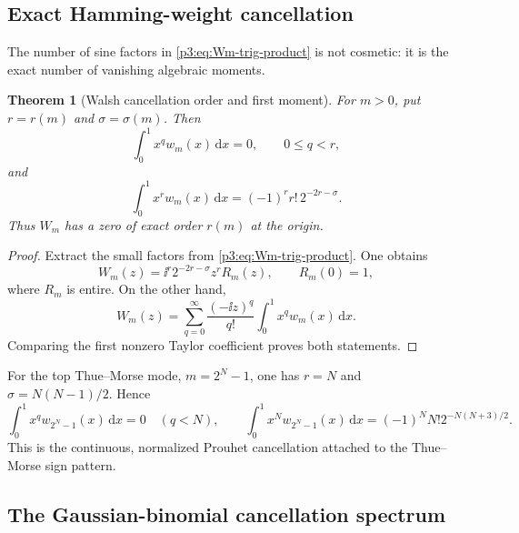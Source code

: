 \documentclass[11pt]{article}
\newtheorem{theorem}{Theorem}[section]
\theoremstyle{definition}
\theoremstyle{remark}
\newcommand{\dd}{\,\mathrm d}
\begin{document}
\subsection{Exact Hamming-weight cancellation}

The number of sine factors in \eqref{p3:eq:Wm-trig-product} is not cosmetic: it is
the exact number of vanishing algebraic moments.

\begin{theorem}[Walsh cancellation order and first moment]
\label{p3:thm:Walsh-moment-cancellation}
For $m>0$, put $r=r(m)$ and $\sigma=\sigma(m)$.  Then
\begin{equation}\label{p3:eq:Walsh-vanishing-moments}
 \int_0^1x^qw_m(x)\dd x=0,
 \qquad 0\le q<r,
\end{equation}
and
\begin{equation}\label{p3:eq:Walsh-first-moment}
 \int_0^1x^rw_m(x)\dd x
 =(-1)^rr!\,2^{-2r-\sigma}.
\end{equation}
Thus $W_m$ has a zero of exact order $r(m)$ at the origin.
\end{theorem}

\begin{proof}
Extract the small factors from \eqref{p3:eq:Wm-trig-product}.  One obtains
\begin{equation}\label{p3:eq:Wm-factorized-origin}
 W_m(z)=\ii^r2^{-2r-\sigma}z^rR_m(z),
 \qquad R_m(0)=1,
\end{equation}
where $R_m$ is entire.  On the other hand,
\begin{equation}\label{p3:eq:Wm-moment-Taylor}
 W_m(z)=\sum_{q=0}^\infty\frac{(-\ii z)^q}{q!}
 \int_0^1x^qw_m(x)\dd x.
\end{equation}
Comparing the first nonzero Taylor coefficient proves both statements.
\end{proof}

For the top Thue--Morse mode, $m=2^N-1$, one has $r=N$ and
$\sigma=N(N-1)/2$.  Hence
\begin{equation}\label{p3:eq:Thue-Morse-moment}
 \int_0^1x^qw_{2^N-1}(x)\dd x=0\quad(q<N),
 \qquad
 \int_0^1x^Nw_{2^N-1}(x)\dd x
 =(-1)^NN!2^{-N(N+3)/2}.
\end{equation}
This is the continuous, normalized Prouhet cancellation attached to the
Thue--Morse sign pattern.

\subsection{The Gaussian-binomial cancellation spectrum}
\end{document}
